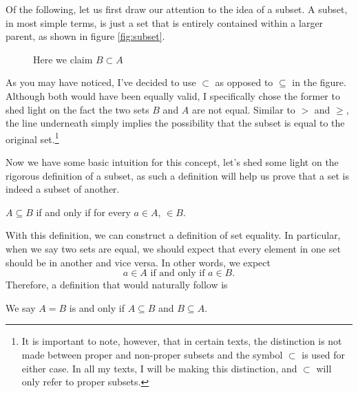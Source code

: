 Of the following, let us first draw our attention to the idea of a subset. A subset, in most simple terms, is just a set that is entirely contained within a larger parent, as shown in figure \eqref{fig:subset}. 
\begin{figure}[h]
	\centering
	\caption{Here we claim $B\subset A$}
	\label{fig:subset}
\end{figure}
As you may have noticed, I've decided to use $\subset$ as opposed to $\subseteq$ in the figure.
Although both would have been equally valid, I specifically chose the former to shed light on the fact the two sets $B$ and $A$ are not equal. 
Similar to $>$ and $\ge$, the line underneath simply implies the possibility that the subset is equal to the original set.\footnote{
It is important to note, however, that in certain texts, the distinction is not made between proper and non-proper subsets and the symbol $\subset$ is used for either case. In all my texts, I will be making this distinction, and $\subset$ will only refer to proper subsets.}

Now we have some basic intuition for this concept, let's shed some light on the rigorous definition of a subset, as such a definition will help us prove that a set is indeed a subset of another.
\begin{define}
	$A\subseteq B$ if and only if \footnotemark for every $a\in A$, $\in B$.
\end{define}

With this definition, we can construct a definition of set equality.
In particular, when we say two sets are equal, we should expect that every element in one set should be in another and vice versa. In other words, we expect
$$a\in A \text{ if and only if } a \in B.$$
Therefore, a definition that would naturally follow is
\begin{define}
We say $A=B$ is and only if $A\subseteq B$ and $B\subseteq A$.\footnotemark
\end{define}

